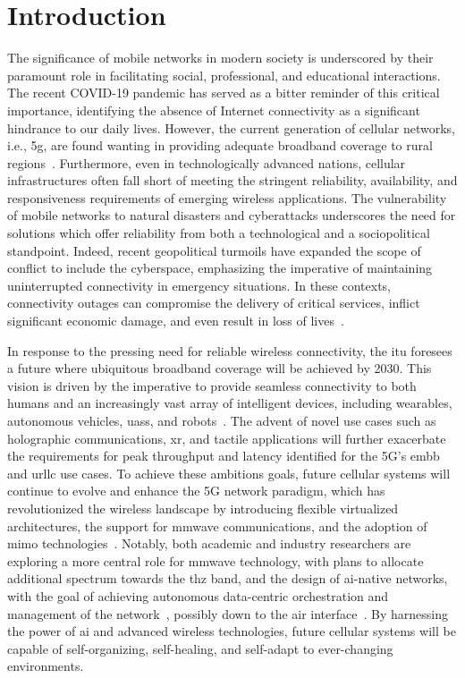 \chapter{Introduction}

The significance of mobile networks in modern society is underscored by their paramount role in facilitating social, professional, and educational interactions. The recent COVID-19 pandemic has served as a bitter reminder of this critical importance, identifying the absence of Internet connectivity as a significant hindrance to our daily lives.
However, the current generation of cellular networks, i.e., \gls{5g}, are found wanting in providing adequate broadband coverage to rural regions~\cite{yaacoub2020key}. Furthermore, even in technologically advanced nations, cellular infrastructures often fall short of meeting the stringent reliability, availability, and responsiveness requirements of emerging wireless applications. The vulnerability of mobile networks to natural disasters and cyberattacks underscores the need for solutions which offer reliability from both a technological and a sociopolitical standpoint.
Indeed, recent geopolitical turmoils have expanded the scope of conflict to include the cyberspace, emphasizing the imperative of maintaining uninterrupted connectivity in emergency situations. In these contexts, connectivity outages can compromise the delivery of critical services, inflict significant economic damage, and even result in loss of lives~\cite{internet_ukr_afg}.

In response to the pressing need for reliable wireless connectivity, the \gls{itu} foresees a future where ubiquitous broadband coverage will be achieved by 2030. This vision is driven by the imperative to provide seamless connectivity to both humans and an increasingly vast array of intelligent devices, including wearables, autonomous vehicles, \glspl{uas}, and robots~\cite{mozaffari2018beyond}.
The advent of novel use cases such as holographic communications, \gls{xr}, and tactile applications will further exacerbate the requirements for peak throughput and latency identified for the 5G's \gls{embb} and \gls{urllc} use cases. 
To achieve these ambitions goals, future cellular systems will continue to evolve and enhance the 5G network paradigm, which has revolutionized the wireless landscape by introducing flexible virtualized architectures, the support for \gls{mmwave} communications, and the adoption of \gls{mimo} technologies~\cite{ghosh20195g}. 
Notably, both academic and industry researchers are exploring a more central role for \gls{mmwave} technology, with plans to allocate additional spectrum towards the \gls{thz} band, and the design of \gls{ai}-native networks, with the goal of achieving autonomous data-centric orchestration and management of the network~\cite{polese20216g}, possibly down to the air interface~\cite{hoydis2021toward}.
By harnessing the power of \gls{ai} and advanced wireless technologies, future cellular systems will be capable of self-organizing, self-healing, and self-adapt to ever-changing environments.

